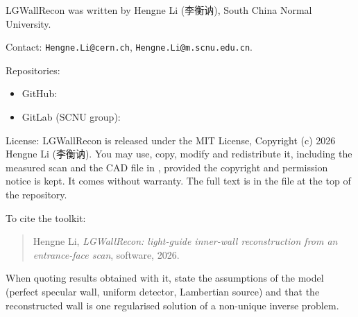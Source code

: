 \documentclass[11pt,a4paper]{article}
\newcommand{\code}[1]{\texttt{#1}}
\begin{document}
LGWallRecon was written by Hengne Li (李衡讷), South China Normal University.

Contact: \code{Hengne.Li@cern.ch}, \code{Hengne.Li@m.scnu.edu.cn}.

Repositories:
\begin{itemize}
\item GitHub: \GithubURL
\item GitLab (SCNU group): \GitlabURL
\end{itemize}

License: LGWallRecon is released under the MIT License, Copyright (c) 2026 Hengne Li (李衡讷).
You may use, copy, modify and redistribute it, including the measured scan and the CAD file in
, provided the copyright and permission notice is kept. It comes without warranty.
The full text is in the file  at the top of the repository.

To cite the toolkit:
\begin{quote}
Hengne Li, \emph{LGWallRecon: light-guide inner-wall reconstruction from an entrance-face scan},
software, 2026.\\
\GithubURL
\end{quote}

When quoting results obtained with it, state the assumptions of the model (perfect specular wall,
uniform detector, Lambertian source) and that the reconstructed wall is one regularised solution
of a non-unique inverse problem.
\end{document}
